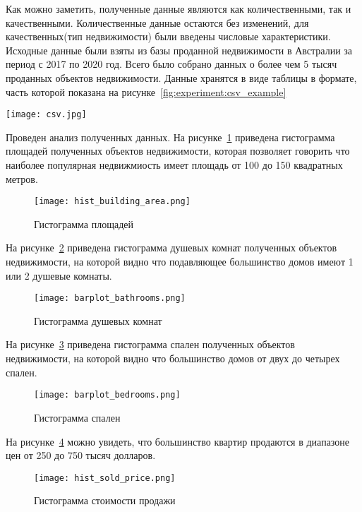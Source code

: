 Как можно заметить, полученные данные являются как количественными, так и качественными. Количественные данные остаются
без изменений, для качественных(тип недвижимости) были введены числовые характеристики.
Исходные данные были взяты из базы проданной недвижимости в Австралии за период с 2017 по 2020 год.
Всего было собрано данных о более чем 5 тысяч проданных объектов недвижимости. Данные хранятся в виде 
таблицы в формате, часть которой показана на рисунке~\ref{fig:experiment:csv_example}

\begin{sidewaysfigure}
  \centering
    \texttt{[image: csv.jpg]}
    \caption{Исходные данные в csv формате}
    \label{fig:experiment:csv_example}
\end{sidewaysfigure}

Проведен анализ полученных данных. На рисунке~\ref{fig:experiment:hist_building_area} приведена гистограмма площадей
полученных объектов недвижимости, которая позволяет говорить что наиболее популярная недвижмиость имеет площадь от 100
до 150 квадратных метров.

\begin{figure}[!ht]
  \centering
  \texttt{[image: hist\_building\_area.png]} 
  \caption{Гистограмма площадей}
  \label{fig:experiment:hist_building_area}
\end{figure}

На рисунке~\ref{fig:experiment:barplot_bathrooms} приведена гистограмма душевых комнат
полученных объектов недвижимости, на которой видно что подавляющее большинство домов имеют 1 или 2 душевые комнаты.
\pagebreak

\begin{figure}[!ht]
  \centering
  \texttt{[image: barplot\_bathrooms.png]} 
  \caption{Гистограмма душевых комнат}
  \label{fig:experiment:barplot_bathrooms}
\end{figure}

На рисунке~\ref{fig:experiment:barplot_bedrooms} приведена гистограмма спален
полученных объектов недвижимости, на которой видно что большинство домов от двух до четырех спален.

\begin{figure}[!ht]
  \centering
  \texttt{[image: barplot\_bedrooms.png]} 
  \caption{Гистограмма спален}
  \label{fig:experiment:barplot_bedrooms}
\end{figure}

На рисунке~\ref{fig:experiment:hist_sold_price} можно увидеть, что большинство квартир продаются в диапазоне
цен от 250 до 750 тысяч долларов.

\begin{figure}[!ht]
  \centering
  \texttt{[image: hist\_sold\_price.png]} 
  \caption{Гистограмма стоимости продажи}
  \label{fig:experiment:hist_sold_price}
\end{figure}
